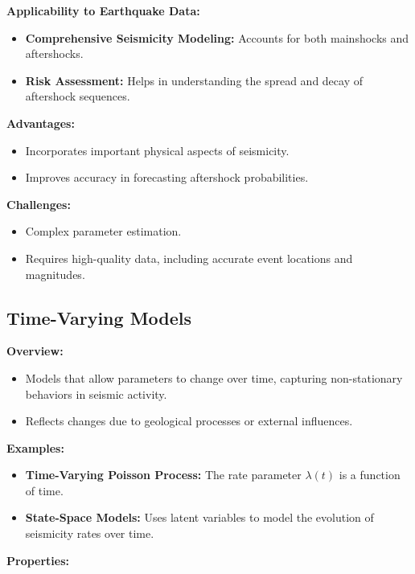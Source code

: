 \documentclass{article}
\begin{document}
\textbf{Applicability to Earthquake Data:}

\begin{itemize}
    \item \textbf{Comprehensive Seismicity Modeling:} Accounts for both mainshocks and aftershocks.
    \item \textbf{Risk Assessment:} Helps in understanding the spread and decay of aftershock sequences.
\end{itemize}

\textbf{Advantages:}

\begin{itemize}
    \item Incorporates important physical aspects of seismicity.
    \item Improves accuracy in forecasting aftershock probabilities.
\end{itemize}

\textbf{Challenges:}

\begin{itemize}
    \item Complex parameter estimation.
    \item Requires high-quality data, including accurate event locations and magnitudes.
\end{itemize}

\subsection{Time-Varying Models}

\textbf{Overview:}

\begin{itemize}
    \item Models that allow parameters to change over time, capturing non-stationary behaviors in seismic activity.
    \item Reflects changes due to geological processes or external influences.
\end{itemize}

\textbf{Examples:}

\begin{itemize}
    \item \textbf{Time-Varying Poisson Process:} The rate parameter $\lambda(t)$ is a function of time.
    \item \textbf{State-Space Models:} Uses latent variables to model the evolution of seismicity rates over time.
\end{itemize}

\textbf{Properties:}
\end{document}

